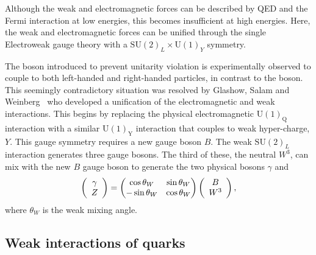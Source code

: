 Although the weak and electromagnetic forces can be described by QED and the Fermi interaction at low energies, this becomes insufficient at high energies. Here, the weak and electromagnetic forces can be unified through the single Electroweak gauge theory with a $\text{SU}(2)_{L}\times\text{U}(1)_{Y}$ symmetry.

The \Z boson introduced to prevent unitarity violation is experimentally observed to couple to both left-handed and right-handed particles, in contrast to the \Wpm boson. This seemingly contradictory situation was resolved by Glashow, Salam and Weinberg~\cite{Glashow:1959wxa,Salam:1968rm,Weinberg:1967tq} who developed a unification of the electromagnetic and weak interactions. 
This begins by replacing the physical electromagnetic $\text{U}(1)_{\text{Q}}$ interaction with a similar $\text{U}(1)_{\text{Y}}$ interaction that couples to weak hyper-charge, $Y$. This gauge symmetry requires a new gauge boson $B$. The weak $\text{SU}(2)_{L}$ interaction generates three gauge bosons. The third of these, the neutral $W^{3}$, can mix with the new $B$ gauge boson to generate the two physical bosons $\gamma$ and \Z
\begin{equation}
\left( \begin{array}{c} \gamma \\ {Z} \end{array} \right) = \begin{pmatrix} \cos{\theta_{W}} & \sin{\theta_{W}} \\ -\sin{\theta_{W}} & \cos{\theta_{W}} \end{pmatrix} \left( \begin{array}{c} B \\ W^{3} \end{array} \right),
\end{equation}
where $\theta_{W}$ is the weak mixing angle. 



\subsection{Weak interactions of quarks}



